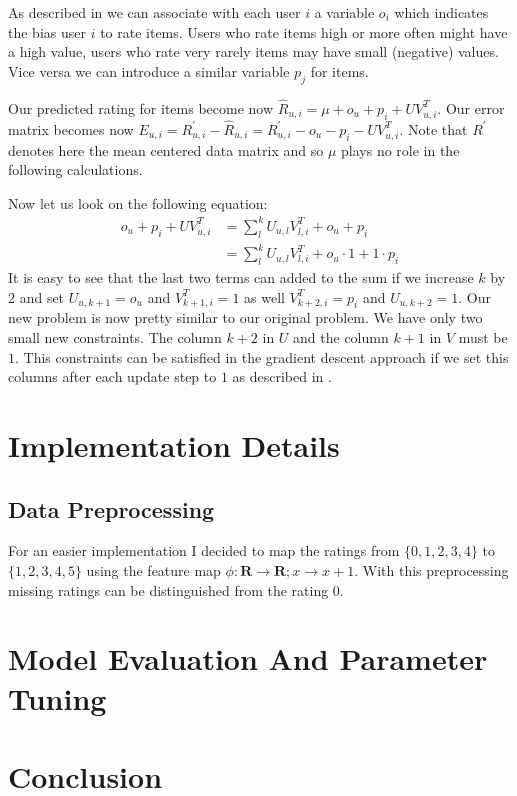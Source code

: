 \documentclass[DIV=14,twocolumn]{scrartcl}
\begin{document}
As described in \cite{Ag16} we can associate with each user $i$ a variable $o_i$ which indicates the bias user $i$ to rate items. Users who rate items high or more often might have a high value, users who rate very rarely items may have small (negative) values. Vice versa we can introduce a similar variable $p_j$ for items.
 
Our predicted rating for items become now $\hat{R}_{u,i} = \mu + o_u + p_i + UV^T_{u,i}$. Our error matrix becomes now $E_{u,i} = R_{u,i}^{'} - \hat{R}_{u,i} = R_{u,i}^{'} - o_u - p_i - UV^T_{u,i}$. Note that $R^{'}$ denotes here the mean centered data matrix and so $\mu$ plays no role in the following calculations.

Now let us look on the following equation:
\begin{equation*}
\begin{split}
o_u + p_i + UV^T_{u,i} &= \sum_{l}^{k}U_{u,l}V^T_{l,i} + o_u + p_i\\ &= \sum_{l}^{k}U_{u,l}V^T_{l,i} + o_u\cdot 1 + 1\cdot p_i
\end{split}
\end{equation*}
It is easy to see that the last two terms can added to the sum if we increase $k$ by $2$ and set $U_{u,k+1}=o_u$ and $V^T_{k+1,i}=1$ as well $V^T_{k+2,i}=p_i$ and $U_{u,k+2}=1$. Our new problem is now pretty similar to our original problem. We have only two small new constraints. The column $k+2$ in $U$ and the column $k+1$ in $V$ must be $1$.
This constraints can be satisfied in the gradient descent approach if we set this columns after each update step to $1$ as described in \cite{Ag16}.
\section{Implementation Details}

\subsection{Data Preprocessing}
For an easier implementation I decided to map the ratings from $\{0,1,2,3,4\}$ to $\{1,2,3,4,5\}$ using the feature map $\phi:\mathbf{R}\rightarrow\mathbf{R};x\rightarrow x + 1$. With this preprocessing missing ratings can be distinguished from the rating 0.



\section{Model Evaluation And Parameter Tuning}

\section{Conclusion}
{}

\end{document}
